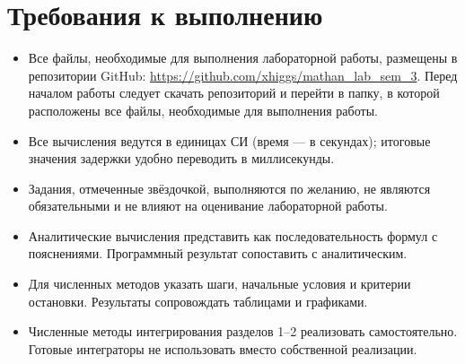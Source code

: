 \documentclass[12pt,a4paper]{article}
\begin{document}
\section*{Требования к выполнению}
\begin{itemize}
\item Все файлы, необходимые для выполнения лабораторной работы, размещены в репозитории GitHub: \url{https://github.com/xhiggs/mathan_lab_sem_3}. 
Перед началом работы следует скачать репозиторий и перейти в папку, в которой расположены все файлы, необходимые для выполнения работы.
\item Все вычисления ведутся в единицах СИ (время --- в секундах);
итоговые значения задержки удобно переводить в миллисекунды.
\item Задания, отмеченные звёздочкой, выполняются по желанию, не являются обязательными и не влияют на оценивание лабораторной работы.
\item Аналитические вычисления представить как последовательность формул
с пояснениями. Программный результат сопоставить с аналитическим.
\item Для численных методов указать шаги, начальные условия и критерии остановки.
Результаты сопровождать таблицами и графиками.
\item Численные методы интегрирования разделов 1--2 реализовать самостоятельно.
Готовые интеграторы не использовать вместо собственной реализации.
\end{itemize}

\setcounter{section}{-1}
\newpage
\end{document}
